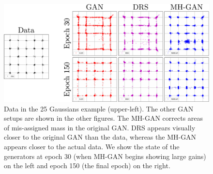 \begin{figure}[tbp]
    \centering
    \includegraphics[width=1.0\linewidth]{figures/mog_unified.pdf}
    \caption{{\small
    Data in the 25 Gaussians example (upper-left)\@.
    The other GAN setups are shown in the other figures.
    The MH-GAN corrects areas of mis-assigned mass in the original GAN\@.
    DRS appears visually closer to the original GAN than the data, whereas the MH-GAN appears closer to the actual data.
    We show the state of the generators at epoch 30 (when MH-GAN begins showing large gains) on the left and epoch 150 (the final epoch) on the right.
    }}
    \label{fig:mog_example}
\end{figure}

